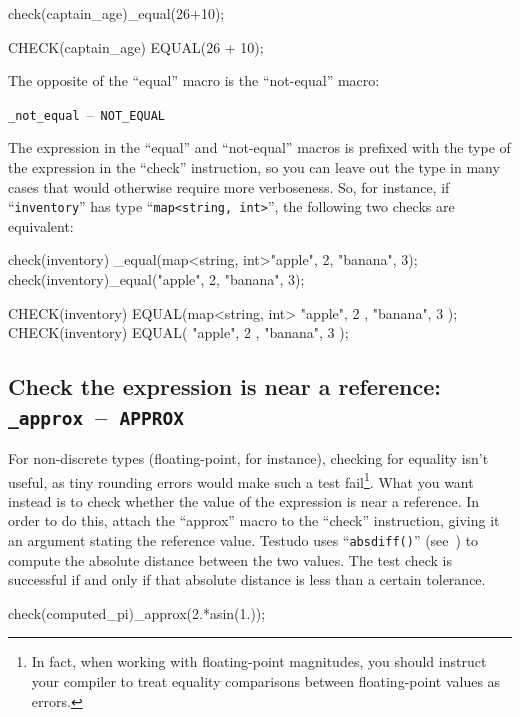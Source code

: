 \documentclass[twoside, a4paper, article]{memoir}
\newcommand*\testudocolor{\color{red!80!blue}}
\newcommand*\testudo[1]{\texttt{\testudocolor{}#1}}
\newcommand*\testudopair[2]{\testudo{#1}~--~\testudo{#2}}
\newcommand\subsectiontestudopair[3]{%
  \subsection[#1]{#1: \testudopair{#2}{#3}}}
\begin{document}
\begin{cpplisting}
check(captain_age)_equal(26+10);
\end{cpplisting}

\begin{cpplisting}
CHECK(captain_age) EQUAL(26 + 10);
\end{cpplisting}

The opposite of the ``equal'' macro is the ``not-equal'' macro:
\begin{center}
  \testudopair{\_not\_equal}{NOT\_EQUAL}
\end{center}

The expression in the ``equal'' and ``not-equal'' macros is prefixed with the
type of the expression in the ``check'' instruction, so you can leave out the
type in many cases that would otherwise require more verboseness.  So, for
instance, if ``\texttt{inventory}'' has type ``\texttt{map<string, int>}'', the
following two checks are equivalent:
\begin{cpplisting}
check(inventory)
  _equal(map<string, int>{{"apple", 2}, {"banana", 3}});
check(inventory)_equal({{"apple", 2}, {"banana", 3}});
\end{cpplisting}

\begin{cpplisting}
CHECK(inventory)
  EQUAL(map<string, int>{ { "apple", 2 }, { "banana", 3 } });
CHECK(inventory) EQUAL({ { "apple", 2 }, { "banana", 3 } });
\end{cpplisting}


\subsectiontestudopair{Check the expression is near a reference}%
  {\_approx}{APPROX}
\label{sec:check-expression-near-reference}

For non-discrete types (floating-point, for instance), checking for equality
isn't useful, as tiny rounding errors would make such a test fail\footnote{In
  fact, when working with floating-point magnitudes, you should instruct your
  compiler to treat equality comparisons between floating-point values as
  errors.}.  What you want instead is to check whether the value of the
expression is near a reference.  In order to do this, attach the ``approx''
macro to the ``check'' instruction, giving it an argument stating the reference
value.  Testudo uses ``\texttt{absdiff()}''
(see~) to compute the absolute distance
between the two values.  The test check is successful if and only if that
absolute distance is less than a certain tolerance.

\begin{cpplisting}
check(computed_pi)_approx(2.*asin(1.));
\end{cpplisting}
\end{document}

